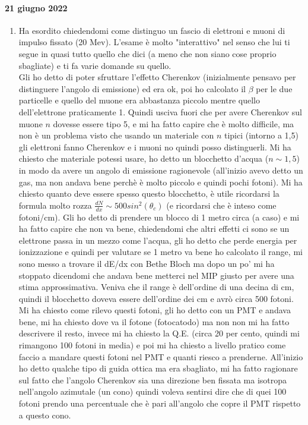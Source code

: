 \documentclass[../main.tex]{subfiles}
\begin{document}
\paragraph{21 giugno 2022}
\begin{itemize}
    \begin{enumerate}
        \item Ha esordito chiedendomi come distinguo un fascio di elettroni e muoni di impulso fissato (20 Mev). L'esame è molto "interattivo" nel senso che lui ti segue in quasi tutto quello che dici (a meno che non siano cose proprio sbagliate) e ti fa varie domande su quello.\\
        Gli ho detto di poter sfruttare l'effetto Cherenkov (inizialmente pensavo per distinguere l'angolo di emissione) ed era ok, poi ho calcolato il $\beta$ per le due particelle e quello del muone era abbastanza piccolo mentre quello dell'elettrone praticamente 1. Quindi usciva fuori che per avere Cherenkov sul muone $n$ dovesse essere tipo 5, e mi ha fatto capire che è molto difficile, ma non è un problema visto che usando un materiale con $n$ tipici (intorno a 1,5) gli elettroni fanno Cherenkov e i muoni no quindi posso distinguerli. Mi ha chiesto che materiale potessi usare, ho detto un blocchetto d'acqua ($ n \sim 1,5$) in modo da avere un angolo di emissione ragionevole (all'inizio avevo detto un gas, ma non andava bene perchè è molto piccolo e quindi pochi fotoni). Mi ha chiesto quanto deve essere spesso questo blocchetto, è utile ricordarsi la formula molto rozza $\frac{dN}{dx} \sim 500sin^2(\theta_c)$ (e ricordarsi che è inteso come fotoni/cm). Gli ho detto di prendere un blocco di 1 metro circa (a caso) e mi ha fatto capire che non va bene, chiedendomi che altri effetti ci sono se un elettrone passa in un mezzo come l'acqua, gli ho detto che perde energia per ionizzazione e quindi per valutare se 1 metro va bene ho calcolato il range, mi sono messo a trovare il dE/dx con Bethe Bloch ma dopo un po' mi ha stoppato dicendomi che andava bene metterci nel MIP giusto per avere una stima approssimativa. Veniva che il range è dell'ordine di una decina di cm, quindi il blocchetto doveva essere dell'ordine dei cm e avrò circa 500 fotoni. \\
        Mi ha chiesto come rilevo questi fotoni, gli ho detto con un PMT e andava bene, mi ha chiesto dove va il fotone (fotocatodo) ma non non mi ha fatto descrivere il resto, invece mi ha chiesto la Q.E. (circa 20 per cento, quindi mi rimangono 100 fotoni in media) e poi mi ha chiesto a livello pratico come faccio a mandare questi fotoni nel PMT e quanti riesco a prenderne. All'inizio ho detto qualche tipo di guida ottica ma era sbagliato, mi ha fatto ragionare sul fatto che l'angolo Cherenkov sia una direzione ben fissata ma isotropa nell'angolo azimutale (un cono) quindi voleva sentirsi dire che di quei 100 fotoni prendo una percentuale che è pari all'angolo che copre il PMT rispetto a questo cono.

\end{enumerate}
\end{itemize}
\end{document}
